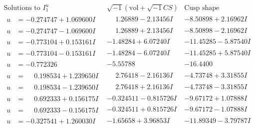 \documentclass[1p]{elsarticle_modified}
\theoremstyle{definition}
\newcommand{\I}{\sqrt{-1}}
\begin{document}
$$\begin{array}{c|c|c}  
\text{Solutions to }I^u_{1}& \I (\text{vol} + \sqrt{-1}CS) & \text{Cusp shape}\\
 \hline 
\begin{aligned}
u &= -0.274747 + 1.069600 I\end{aligned}
 & \phantom{-}1.26889 - 2.13456 I & -8.50898 + 2.16962 I \\ \hline\begin{aligned}
u &= -0.274747 - 1.069600 I\end{aligned}
 & \phantom{-}1.26889 + 2.13456 I & -8.50898 - 2.16962 I \\ \hline\begin{aligned}
u &= -0.773104 + 0.153161 I\end{aligned}
 & -1.48284 + 6.07240 I & -11.45285 - 5.87540 I \\ \hline\begin{aligned}
u &= -0.773104 - 0.153161 I\end{aligned}
 & -1.48284 - 6.07240 I & -11.45285 + 5.87540 I \\ \hline\begin{aligned}
u &= -0.772326\phantom{ +0.000000I}\end{aligned}
 & -5.55788\phantom{ +0.000000I} & -16.4400\phantom{ +0.000000I} \\ \hline\begin{aligned}
u &= \phantom{-}0.198534 + 1.239650 I\end{aligned}
 & \phantom{-}2.76418 - 2.16136 I & -4.73748 + 3.31855 I \\ \hline\begin{aligned}
u &= \phantom{-}0.198534 - 1.239650 I\end{aligned}
 & \phantom{-}2.76418 + 2.16136 I & -4.73748 - 3.31855 I \\ \hline\begin{aligned}
u &= \phantom{-}0.692333 + 0.156175 I\end{aligned}
 & -0.324511 - 0.815726 I & -9.67172 + 1.07888 I \\ \hline\begin{aligned}
u &= \phantom{-}0.692333 - 0.156175 I\end{aligned}
 & -0.324511 + 0.815726 I & -9.67172 - 1.07888 I \\ \hline\begin{aligned}
u &= -0.327541 + 1.260030 I\end{aligned}
 & -1.65658 + 3.96853 I & -11.89349 - 3.79787 I \\ \hline\begin{aligned}

\end{aligned}
\end{array}$$
\end{document}
